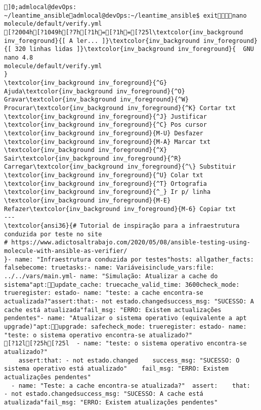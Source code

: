 \documentclass{scrartcl}
\title{}
\begin{document}
\begin{Verbatim}
]0;admlocal@devOps: ~/leantime_ansibleadmlocal@devOps:~/leantime_ansible$ exitnano molecule/default/verify.yml 
[?2004h[?1049h[?7h[?1h=[?1h=[?25l\textcolor{inv_background inv_foreground}{[ A ler... ]}\textcolor{inv_background inv_foreground}{[ 320 linhas lidas ]}\textcolor{inv_background inv_foreground}{  GNU nano 4.8                                          molecule/default/verify.yml                                                       }
\textcolor{inv_background inv_foreground}{^G} Ajuda\textcolor{inv_background inv_foreground}{^O} Gravar\textcolor{inv_background inv_foreground}{^W} Procurar\textcolor{inv_background inv_foreground}{^K} Cortar txt    \textcolor{inv_background inv_foreground}{^J} Justificar    \textcolor{inv_background inv_foreground}{^C} Pos cursor    \textcolor{inv_background inv_foreground}{M-U} Desfazer     \textcolor{inv_background inv_foreground}{M-A} Marcar txt
\textcolor{inv_background inv_foreground}{^X} Sair\textcolor{inv_background inv_foreground}{^R} Carregar\textcolor{inv_background inv_foreground}{^\} Substituir    \textcolor{inv_background inv_foreground}{^U} Colar txt     \textcolor{inv_background inv_foreground}{^T} Ortografia    \textcolor{inv_background inv_foreground}{^_} Ir p/ linha   \textcolor{inv_background inv_foreground}{M-E} Refazer\textcolor{inv_background inv_foreground}{M-6} Copiar txt
---
\textcolor{ansi36}{# Tutorial de inspiração para a infraestrutura conduzida por teste no site
# https://www.adictosaltrabajo.com/2020/05/08/ansible-testing-using-molecule-with-ansible-as-verifier/
}- name: "Infraestrutura conduzida por testes"hosts: allgather_facts: falsebecome: truetasks:- name: Variáveisinclude_vars:file: ../../vars/main.yml- name: "Simulação: Atualizar a cache do sistema"apt:update_cache: truecache_valid_time: 3600check_mode: trueregister: estado- name: "teste: a cache encontra-se actualizada?"assert:that:- not estado.changedsuccess_msg: "SUCESSO: A cache está atualizada"fail_msg: "ERRO: Existem actualizações pendentes"- name: "Atualizar o sistema operativo (equivalente a apt upgrade)"apt:upgrade: safecheck_mode: trueregister: estado- name: "teste: o sistema operativo encontra-se atualizado?"
[?12l[?25h[?25l  - name: "teste: o sistema operativo encontra-se atualizado?"
    assert:that: - not estado.changed    success_msg: "SUCESSO: O sistema operativo está atualizado"    fail_msg: "ERRO: Existem actualizações pendentes"
  - name: "Teste: a cache encontra-se atualizada?"  assert:    that:  - not estado.changedsuccess_msg: "SUCESSO: A cache está atualizada"fail_msg: "ERRO: Existem atualizações pendentes"

\end{Verbatim}
\end{document}
